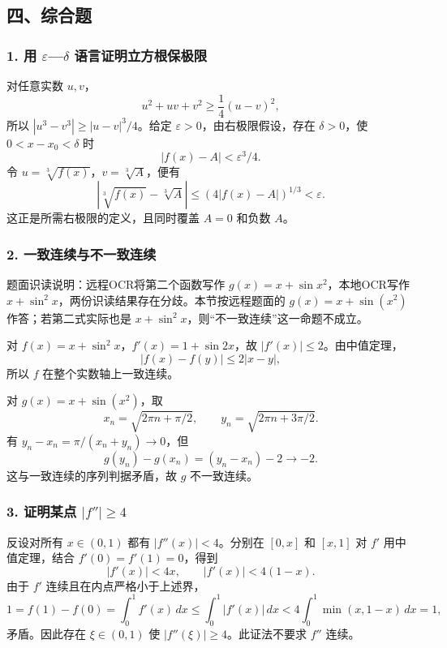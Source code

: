 \documentclass[11pt,fontset=fandol]{ctexart}
\begin{document}
\subsection{四、综合题}\label{ux56dbux7efcux5408ux9898}

\subsubsection{\texorpdfstring{1. 用 \(\varepsilon\)---\(\delta\)
语言证明立方根保极限}{1. 用 \textbackslash varepsilon---\textbackslash delta 语言证明立方根保极限}}\label{ux7528-varepsilondelta-ux8bedux8a00ux8bc1ux660eux7acbux65b9ux6839ux4fddux6781ux9650}

对任意实数 \(u,v\)， \[
u^2+uv+v^2\ge\frac14(u-v)^2,
\] 所以 \(|u^3-v^3|\ge|u-v|^3/4\)。给定
\(\varepsilon>0\)，由右极限假设，存在 \(\delta>0\)，使
\(0<x-x_0<\delta\) 时 \[
|f(x)-A|<\varepsilon^3/4.
\] 令 \(u=\sqrt[3]{f(x)}\)，\(v=\sqrt[3]A\)，便有 \[
|\sqrt[3]{f(x)}-\sqrt[3]A|
\le(4|f(x)-A|)^{1/3}<\varepsilon.
\] 这正是所需右极限的定义，且同时覆盖 \(A=0\) 和负数 \(A\)。

\subsubsection{2.
一致连续与不一致连续}\label{ux4e00ux81f4ux8fdeux7eedux4e0eux4e0dux4e00ux81f4ux8fdeux7eed}

题面识读说明：远程OCR将第二个函数写作 \(g(x)=x+\sin x^2\)，本地OCR写作
\(x+\sin^2x\)，两份识读结果存在分歧。本节按远程题面的
\(g(x)=x+\sin(x^2)\) 作答；若第二式实际也是
\(x+\sin^2x\)，则``不一致连续''这一命题不成立。

对 \(f(x)=x+\sin^2x\)，\(f'(x)=1+\sin2x\)，故
\(|f'(x)|\le2\)。由中值定理， \[
|f(x)-f(y)|\le2|x-y|,
\] 所以 \(f\) 在整个实数轴上一致连续。

对 \(g(x)=x+\sin(x^2)\)，取 \[
x_n=\sqrt{2\pi n+\pi/2},\qquad y_n=\sqrt{2\pi n+3\pi/2}.
\] 有 \(y_n-x_n=\pi/(x_n+y_n)\to0\)，但 \[
g(y_n)-g(x_n)=(y_n-x_n)-2\to-2.
\] 这与一致连续的序列判据矛盾，故 \(g\) 不一致连续。

\subsubsection{\texorpdfstring{3. 证明某点
\(|f''|\ge4\)}{3. 证明某点 \textbar f\textquotesingle\textquotesingle\textbar\textbackslash ge4}}\label{ux8bc1ux660eux67d0ux70b9-fge4}

反设对所有 \(x\in(0,1)\) 都有 \(|f''(x)|<4\)。分别在 \([0,x]\) 和
\([x,1]\) 对 \(f'\) 用中值定理，结合 \(f'(0)=f'(1)=0\)，得到 \[
|f'(x)|<4x,\qquad |f'(x)|<4(1-x).
\] 由于 \(f'\) 连续且在内点严格小于上述界， \[
1=f(1)-f(0)=\int_0^1f'(x)\,dx
\le\int_0^1|f'(x)|\,dx
<4\int_0^1\min(x,1-x)\,dx=1,
\] 矛盾。因此存在 \(\xi\in(0,1)\) 使 \(|f''(\xi)|\ge4\)。此证法不要求
\(f''\) 连续。
\end{document}
